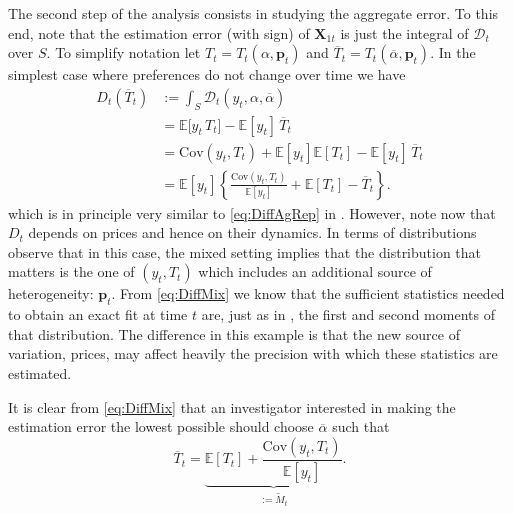 \documentclass[english, a4paper, 12pt]{article}
\begin{document}
The second step of the analysis consists in studying the aggregate error. To this end, note that the estimation error (with sign) of $\mathbf{X}_{1t}$ is just the integral of $\mathcal{D}_{t}$ over $S$. To simplify notation let $T_{t} = T_{t}(\alpha , \mathbf{p}_{t})$ and $\overline{T}_{t} = T_{t}(\overline{\alpha}, \mathbf{p}_{t})$. In the simplest case where preferences do not change over time we have
	\begin{equation} \label{eq:DiffMix}
	\begin{aligned} 
		D_{t}\left(\overline{T}_{t}\right)
			&:=	\int_{S} \mathcal{D}_{t}(y_{t},\alpha,\overline{\alpha})	\\
			&=	\mathbb{E}\big[y_{t} \, T_{t}\big] - \mathbb{E}[y_{t}]\, \overline{T}_{t}		\\
			&=	\mathrm{Cov}\left(y_{t}, T_{t} \right) + \mathbb{E}[y_{t}]\mathbb{E}\left[T_{t}\right] - \mathbb{E}[y_{t}]\, \overline{T}_{t}	\\
			&= 	\mathbb{E}[y_{t}]\left\{ \frac{\mathrm{Cov}\left(y_{t}, T_{t} \right)}{\mathbb{E}[y_{t}]} + \mathbb{E}\left[T_{t}\right] - \overline{T}_{t} \right\}.
	\end{aligned}
	\end{equation}
which is in principle very similar to \eqref{eq:DiffAgRep} in . However, note now that $D_{t}$ depends on prices and hence on their dynamics. In terms of distributions observe that in this case, the mixed setting implies that the distribution that matters is the one of $(y_{t},T_{t})$ which includes an additional source of heterogeneity: $\mathbf{p}_{t}$. From \eqref{eq:DiffMix} we know that the sufficient statistics needed to obtain an exact fit at time $t$ are, just as in , the first and second moments of that distribution. The difference in this example is that the new source of variation, prices, may affect heavily the precision with which these statistics are estimated.

It is clear from \eqref{eq:DiffMix} that an investigator interested in making the estimation error the lowest possible should choose $\overline{\alpha}$ such that
	\begin{equation} \label{eq:OptT}
		\overline{T}_{t} =  \underbrace{\mathbb{E}\left[T_{t} \right] + \frac{\mathrm{Cov}\left(y_{t}, T_{t} \right)}{\mathbb{E}[y_{t}]}}_{:= \tilde{M}_{t}}.
	\end{equation}
\end{document}
